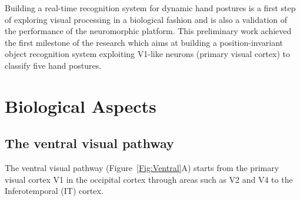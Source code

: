 \documentclass[journal]{journal}
\begin{document}
Building a real-time recognition system for dynamic hand postures is a first step of exploring visual processing in a biological fashion and is also a validation of the performance of the neuromorphic platform.
This preliminary work achieved the first milestone of the research which aims at building a position-invariant object recognition system exploiting V1-like neurons (primary visual cortex) to classify five hand postures. 

\section{Biological Aspects}
\label{sec:bio}


\subsection{The ventral visual pathway}
The ventral visual pathway (Figure~\ref{Fig:Ventral}A) starts from the primary visual cortex V1 in the occipital cortex through areas such as V2 and V4 to the Inferotemporal (IT) cortex.
\end{document}
